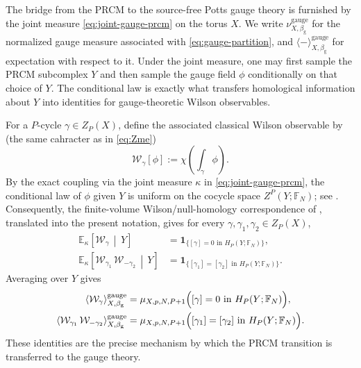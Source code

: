 The bridge from the PRCM to the source-free Potts gauge theory is furnished by
the joint measure \eqref{eq:joint-gauge-prcm} on the torus \(X\). We write
\(\nu^{\mathrm{gauge}}_{X,\beta_{\mathrm g}}\) for the normalized gauge measure
associated with \eqref{eq:gauge-partition}, and
\(\langle-\rangle^{\mathrm{gauge}}_{X,\beta_{\mathrm g}}\) for expectation with
respect to it. Under the joint measure, one may first sample the PRCM
subcomplex \(Y\) and then sample the gauge field \(\phi\) conditionally on that
choice of \(Y\). The conditional law is exactly what transfers homological
information about \(Y\) into identities for gauge-theoretic Wilson observables.

For a \(P\)-cycle \(\gamma\in Z_P(X)\), define the associated classical Wilson observable by (the same cahracter as in \eqref{eq:Zme})
\begin{equation}
	\mathcal W_\gamma[\phi]
	:=
	\chi\left(\int_\gamma \phi\right).
	\label{eq:classical-Wilson}
\end{equation}
By the exact coupling via the joint measure \(\kappa\) in
\eqref{eq:joint-gauge-prcm}, the conditional law of \(\phi\) given \(Y\) is
uniform on the cocycle space \(Z^P(Y;\mathbb F_N)\); see
\cite[Prop.~21]{DuncanSchweinhartTopological}. Consequently, the finite-volume
Wilson/null-homology correspondence of
\cite[Cor.~29 and Cor.~30]{DuncanSchweinhartTopological}, translated into the
present notation, gives for every \(\gamma,\gamma_1,\gamma_2\in Z_P(X)\),
\begin{align}
	\mathbb E_{\kappa}\!\left[\mathcal W_\gamma \,\middle|\, Y\right]
	&=
	\mathbf 1_{\{
		[\gamma]=0\text{ in }H_P(Y;\mathbb F_N)
		\}},
	\label{eq:toric-conditional-one-point}
	\\
	\mathbb E_{\kappa}\!\left[
	\mathcal W_{\gamma_1}\,\mathcal W_{-\gamma_2}
	\,\middle|\, Y
	\right]
	&=
	\mathbf 1_{\{
		[\gamma_1]=[\gamma_2]\text{ in }H_P(Y;\mathbb F_N)
		\}}.
	\label{eq:toric-conditional-two-point}
\end{align}
Averaging over \(Y\) gives
\begin{align}
	\left\langle \mathcal W_\gamma \right\rangle^{\mathrm{gauge}}_{X,\beta_{\mathrm g}}
	&=
	\mu_{X,p,N,P+1}
	\Bigl(
	[\gamma]=0\text{ in }H_P(Y;\mathbb F_N)
	\Bigr),
	\label{eq:toric-one-point}
	\\
	\left\langle
	\mathcal W_{\gamma_1}\,\mathcal W_{-\gamma_2}
	\right\rangle^{\mathrm{gauge}}_{X,\beta_{\mathrm g}}
	&=
	\mu_{X,p,N,P+1}
	\Bigl(
	[\gamma_1]=[\gamma_2]\text{ in }H_P(Y;\mathbb F_N)
	\Bigr).
	\label{eq:toric-two-point}
\end{align}
These identities are the precise mechanism by which the PRCM transition is
transferred to the gauge theory.

